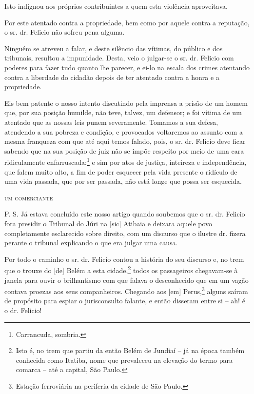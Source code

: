 Isto indignou aos próprios contribuintes a quem esta violência
aproveitava.

Por este atentado contra a propriedade, bem como por aquele contra a
reputação, o sr. dr. Felicio não sofreu pena alguma.

Ninguém se atreveu a falar, e deste silêncio das vítimas, do público e
dos tribunais, resultou a impunidade. Desta, veio o julgar-se o sr. dr.
Felicio com poderes para fazer tudo quanto lhe parecer, e ei-lo na
escala dos crimes atentando contra a liberdade do cidadão depois de ter
atentado contra a honra e a propriedade.

Eis bem patente o nosso intento discutindo pela imprensa a prisão de um
homem que, por sua posição humilde, não teve, talvez, um defensor; e foi
vítima de um atentado que as nossas leis punem severamente. Tomamos a
sua defesa, atendendo a sua pobreza e condição, e provocados voltaremos
ao assunto com a mesma franqueza com que até aqui temos falado, pois, o
sr. dr. Felicio deve ficar sabendo que na sua posição de juiz não se
impõe respeito por meio de uma cara ridiculamente
enfarruscada;\footnote{ Carrancuda, sombria.} e sim por atos de
justiça, inteireza e independência, que falem muito alto, a fim de poder
esquecer pela vida presente o ridículo de uma vida passada, que por ser
passada, não está longe que possa ser esquecida.

\begin{flushright}
\textsc{um comerciante}
\end{flushright}

P. S. Já estava concluído este nosso artigo quando soubemos que o sr.
dr. Felicio fora presidir o Tribunal do Júri na {[}sic{]} Atibaia e
deixara aquele povo completamente esclarecido sobre direito, com um
discurso que o ilustre dr. fizera perante o tribunal explicando o que
era julgar uma causa.

Por todo o caminho o sr. dr. Felicio contou a história do seu discurso
e, no trem que o trouxe do {[}de{]} Belém a esta cidade,\footnote{ Isto
  é, no trem que partiu da então Belém de Jundiaí -- já na época também
  conhecida como Itatiba, nome que prevaleceu na elevação do termo para
  comarca -- até a capital, São Paulo.} todos os passageiros chegavam-se
à janela para ouvir o brilhantismo com que falava o desconhecido que em
um vagão contava proezas aos seus companheiros. Chegando aos {[}em{]}
Perus,\footnote{ Estação ferroviária na periferia da cidade de São
  Paulo.} alguns saíram de propósito para espiar o jurisconsulto
falante, e então disseram entre si -- ah! é o dr. Felicio!

